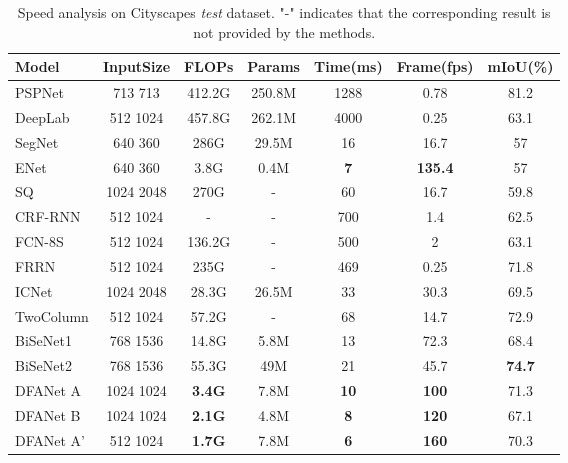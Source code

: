 \documentclass[10pt,twocolumn,letterpaper]{article}
\begin{document}
\begin{table*}
\begin{center}
\begin{tabular}{|l|c|c|c|c|c|c|}
\hline
Model                     & InputSize & FLOPs                  & Params & Time(ms) & Frame(fps) & mIoU(\%) \\
\hline\hline
PSPNet\cite{pspnet}      & 713  713    & 412.2G     & 250.8M     & 1288 & 0.78 & 81.2 \\
DeepLab\cite{DeepLab2}    & 512  1024  & 457.8G  & 262.1M     & 4000 & 0.25 & 63.1 \\
\hline
SegNet\cite{segnet}       & 640  360   & 286G    & 29.5M & 16   & 16.7 & 57   \\
ENet\cite{enet}           & 640  360   & 3.8G    & 0.4M  & \textbf{7}    & \textbf{135.4} & 57   \\
SQ\cite{SQ}               & 1024  2048 & 270G    & -     & 60   & 16.7 & 59.8 \\
CRF-RNN\cite{crfasRnn}    & 512  1024  & -       & -     & 700  & 1.4  & 62.5 \\
FCN-8S\cite{fcn_seg}      & 512  1024  & 136.2G  & -     & 500  & 2 & 63.1 \\
FRRN\cite{frrn}           & 512  1024  & 235G      & -     & 469  & 0.25 & 71.8 \\
ICNet\cite{ICNet}         & 1024  2048 & 28.3G   & 26.5M     & 33   & 30.3 & 69.5 \\
TwoColumn\cite{twocolumn} & 512  1024  & 57.2G   & -     & 68   & 14.7 & 72.9 \\
BiSeNet1\cite{BiSeNet}    & 768  1536  & 14.8G   & 5.8M  & 13   & 72.3 & 68.4 \\
BiSeNet2\cite{BiSeNet}    & 768  1536  & 55.3G   & 49M   & 21   & 45.7 & \textbf{74.7} \\
\hline
DFANet A                  & 1024  1024 & \textbf{3.4G}  & 7.8M & \textbf{10} & \textbf{100}  & 71.3 \\
DFANet B                  & 1024  1024 & \textbf{2.1G}  & 4.8M & \textbf{8} & \textbf{120}  & 67.1 \\
DFANet A'                 & 512  1024 & \textbf{1.7G}  & 7.8M & \textbf{6} & \textbf{160}  & 70.3 \\
\hline
\end{tabular}
\end{center}
\caption{Speed analysis on Cityscapes \textit{test} dataset. "-" indicates that the corresponding result is not provided by the methods.}
\label{tab:speed analysis}
\end{table*}
\end{document}
